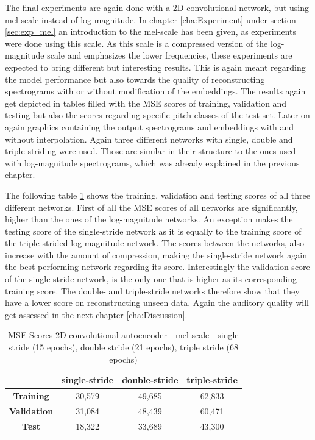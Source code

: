 The final experiments are again done with a 2D convolutional network, but using mel-scale instead of log-magnitude. In chapter \ref{cha:Experiment} under section \ref{sec:exp_mel} an introduction to the mel-scale has been given, as experiments were done using this scale. As this scale is a compressed version of the log-magnitude scale and emphasizes the lower frequencies, these experiments are expected to bring different but interesting results. This is again meant regarding the model performance but also towards the quality of reconstructing spectrograms with or without modification of the embeddings. The results again get depicted in tables filled with the MSE scores of training, validation and testing but also the scores regarding specific pitch classes of the test set. Later on again graphics containing the output spectrograms and embeddings with and without interpolation. Again three different networks with single, double and triple striding were used. Those are similar in their structure to the ones used with log-magnitude spectrograms, which was already explained in the previous chapter.

The following table \ref{tab:res_scores_2D_mel} shows the training, validation and testing scores of all three different networks. First of all the MSE scores of all networks are significantly, higher than the ones of the log-magnitude networks. An exception makes the testing score of the single-stride network as it is equally to the training score of the triple-strided log-magnitude network. The scores between the networks, also increase with the amount of compression, making the single-stride network again the best performing network regarding its score. Interestingly the validation score of the single-stride network, is the only one that is higher as its corresponding training score. The double- and triple-stride networks therefore show that they have a lower score on reconstructing unseen data. Again the auditory quality will get assessed in the next chapter \ref{cha:Discussion}.

\begin{table}[htb!]
    \centering
    \begin{tabular}{|c|c|c|c|}
        \hline
         & \textbf{single-stride} & \textbf{double-stride} & \textbf{triple-stride} \\
         \hline
        \textbf{Training} & 30,579 & 49,685 & 62,833 \\
        \hline
        \textbf{Validation} & 31,084 & 48,439 & 60,471\\
        \hline
        \textbf{Test} & 18,322 & 33,689 & 43,300\\
        \hline
    \end{tabular}
    \caption{MSE-Scores 2D convolutional autoencoder - mel-scale - single stride (15 epochs), double stride (21 epochs), triple stride (68 epochs)}
    \label{tab:res_scores_2D_mel}
\end{table}

